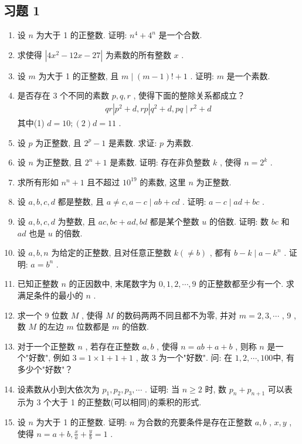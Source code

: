 \subsection{习题 1}
\begin{enumerate}
    \item 设 $n$ 为大于 1 的正整数. 证明:  $n^{4}+4^{n}$ 是一个合数. 
    \item 求使得 $\left|4 x^{2}-12 x-27\right|$ 为素数的所有整数 $x$ . 
    \item 设 $m$ 为大于 1 的正整数, 且 $m \mid(m-1)!+1$ . 证明:  $m$ 是一个素数. 
    \item 是否存在 3 个不同的素数 $p ,  q ,  r$ , 使得下面的整除关系都成立？
    \begin{align*}
        q r\left|p^{2}+d, r p\right| q^{2}+d, p q \mid r^{2}+d
    \end{align*}
    其中(1) $d=10 ;  ( 2 ) d=11$ . 
    \item 设 $p$ 为正整数, 且 $2^{p}-1$ 是素数. 求证:  $p$ 为素数. 
    \item 设 $n$ 为正整数, 且 $2^{n}+1$ 是素数. 证明: 存在非负整数 $k$ , 使得 $n=2^{k}$ . 
    \item 求所有形如 $n^{n}+1$ 且不超过 $10^{19}$ 的素数, 这里 $n$ 为正整数. 
    \item 设 $a ,  b ,  c ,  d$ 都是整数, 且 $a \neq c, a-c \mid a b+c d$ . 证明:  $a-c \mid a d+b c$ . 
    \item 设 $a ,  b ,  c ,  d$ 为整数, 且 $a c ,  b c+a d ,  b d$ 都是某个整数 $u$ 的倍数. 证明: 数 $b c$ 和 $a d$ 也是 $u$ 的倍数. 
    \item 设 $a ,  b ,  n$ 为给定的正整数, 且对任意正整数 $k(\neq b)$ , 都有 $b-k \mid a-k^{n}$ . 证明: $a=b^{n}$ . 
    \item 已知正整数 $n$ 的正因数中, 末尾数字为 $0,1,2, \cdots, 9$ 的正整数都至少有一个. 求满足条件的最小的 $n$ . 
    \item 求一个 9 位数 $M$ , 使得 $M$ 的数码两两不同且都不为零, 并对 $m=2,3, \cdots$ ,  9 , 数 $M$ 的左边 $m$ 位数都是 $m$ 的倍数. 
    \item 对于一个正整数 $n$ , 若存在正整数 $a ,  b$ , 使得 $n=a b+a+b$ , 则称 $n$ 是一个"好数", 例如 $3=1 \times 1+1+1$ , 故 3 为一个"好数". 问: 在 $1,2, \cdots, 100$中, 有多少个"好数"？
    \item 设素数从小到大依次为 $p_{1}, p_{2}, p_{3}, \cdots$ . 证明: 当 $n \geqslant 2$ 时, 数 $p_{n}+p_{n+1}$ 可以表示为 3 个大于 1 的正整数(可以相同)的乘积的形式. 
    \item 设 $n$ 为大于 1 的正整数. 证明:  $n$ 为合数的充要条件是存在正整数 $a ,  b$ ,  $x ,  y$ , 使得 $n=a+b, \frac{x}{a}+\frac{y}{b}=1$ . 

\end{enumerate}
